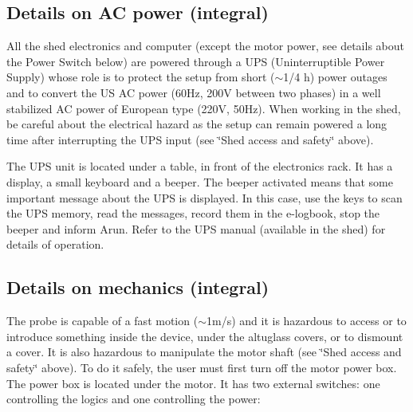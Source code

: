 \subsection{Details on AC power (integral) }

All the shed electronics and computer (except the motor power, see details about
the Power Switch below) are powered through a UPS (Uninterruptible Power Supply)
whose role is to protect the setup from short (\( \sim  \)1/4 h) power outages
and to convert the US AC power (60Hz, 200V between two phases) in a well stabilized
AC power of European type (220V, 50Hz). When working in the shed, be careful
about the electrical hazard as the setup can remain powered a long time after
interrupting the UPS input (see \char`\"{}Shed access and safety\char`\"{} above). 

The UPS unit is located under a table, in front of the electronics rack. It
has a display, a small keyboard and a beeper. The beeper activated means that
some important message about the UPS is displayed. In this case, use the keys
to scan the UPS memory, read the messages, record them in the e-logbook, stop
the beeper and inform Arun. Refer to the UPS manual (available in the shed)
for details of operation. 


\subsection{Details on mechanics (integral) }

The probe is capable of a fast motion (\( \sim  \)1m/s) and it is hazardous to
access or to introduce something inside the device, under the altuglass covers,
or to dismount a cover. It is also hazardous to manipulate the motor shaft (see
\char`\"{}Shed access and safety\char`\"{} above). To do it safely, the user
must first turn off the motor power box. The power box is located under the
motor. It has two external switches: one controlling the logics and one controlling
the power: 


